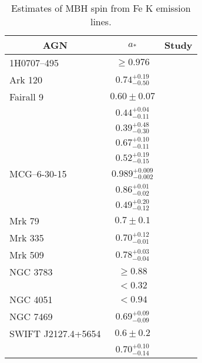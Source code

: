 \begin{table}
\begin{tabular}{lc l }
\toprule
\multicolumn{1}{c}{AGN} & \multicolumn{1}{c}{$a_\ast$} & \multicolumn{1}{c}{Study} \\ \midrule 
1H0707--495 & $\geq 0.976$ & \citet{Zoghbi2010} \\
Ark 120 & $0.74^{+0.19}_{-0.50}$ & \citet{Nardini2011} \\ %
Fairall 9 & $0.60 \pm 0.07$ & \citet{Schmoll2009} \\
 & $0.44^{+0.04}_{-0.11}$ & \citet{Patrick2011} \\
 & $0.39^{+0.48}_{-0.30}$ & \citet{Emmanoulopoulos2011} \\
 & $0.67^{+0.10}_{-0.11}$ & \citet{Patrick2011a} \\
 & $0.52^{+0.19}_{-0.15}$ & \citet{Lohfink2012} \\
MCG--6-30-15 & $0.989^{+0.009}_{-0.002}$ & \citet{Brenneman2006} \\
 & $0.86^{+0.01}_{-0.02}$ & \citet{delaCallePerez2010} \\
 & $0.49^{+0.20}_{-0.12}$ & \citet{Patrick2011a} \\
Mrk 79 & $0.7 \pm 0.1$ & \citet{Gallo2011} \\
Mrk 335 & $0.70^{+0.12}_{-0.01}$ & \citet{Patrick2011} \\
Mrk 509 & $0.78^{+0.03}_{-0.04}$ & \citet{delaCallePerez2010} \\
NGC 3783 & $\geq 0.88$ & \citet{Brenneman2011} \\
 & $< 0.32$ & \citet{Patrick2011a} \\
NGC 4051 & $< 0.94$ & \citet{Patrick2011a} \\
NGC 7469 & $0.69^{+0.09}_{-0.09}$ & \citet{Patrick2011} \\
SWIFT J2127.4+5654 & $0.6 \pm 0.2$ & \citet{Miniutti2009} \\
 & $0.70^{+0.10}_{-0.14}$ & \citet{Patrick2011} \\
 \bottomrule
\end{tabular}
\caption{Estimates of MBH spin from Fe K emission lines.}
\end{table}
